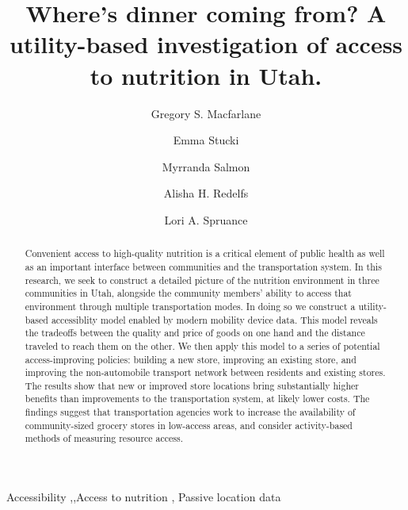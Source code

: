 \documentclass[
  letterpaper,
  number,
  review,
  3p]{elsarticle}
\providecommand{\DIFadd}[1]{{\protect\color{blue}\uwave{#1}}} %
\providecommand{\DIFaddbegin}{} %
\providecommand{\DIFaddend}{} %
\newcommand{\DIFaddincludegraphics}[2][]{{\color{blue}\fbox{\DIFOincludegraphics[#1]{#2}}}} %
\DeclareRobustCommand{\DIFaddbegin}{\DIFOaddbegin \let\includegraphics\DIFaddincludegraphics} %
\DeclareRobustCommand{\DIFaddend}{\DIFOaddend \let\includegraphics\DIFOincludegraphics} %
\begin{document}
\begin{frontmatter}
\title{Where's dinner coming from? A utility-based investigation of
access to nutrition in Utah.}
\author[1]{Gregory S. Macfarlane%
%
}
\author[1]{Emma Stucki%
%
}

\author[1]{Myrranda Salmon%
%
}

\author[2]{Alisha H. Redelfs%
%
}

\author[2]{Lori A. Spruance%
%
}








        
\begin{abstract}
Convenient access to high-quality nutrition is a critical element of
public health as well as an important interface between communities and
the transportation system. In this research, we seek to construct a
detailed picture of the nutrition environment in three communities in
Utah, alongside the community members' ability to access that
environment through multiple transportation modes. In doing so we
construct a utility-based accessiblity model enabled by modern mobility
device data. This model reveals the tradeoffs between the quality and
price of goods on one hand and the distance traveled to reach them on
the other. We then apply this model to a series of potential
access-improving policies: building a new store, improving an existing
store, and improving the non-automobile transport network between
residents and existing stores. The results show that new or improved
store locations bring substantially higher benefits than improvements to
the transportation system, at likely lower costs. The findings suggest
that transportation agencies work to increase the availability of
community-sized grocery stores in low-access areas, and consider
activity-based methods of measuring resource access.
\end{abstract}





\begin{keyword}
    Accessibility \sep \DIFaddbegin \DIFadd{Utility-based access }\sep \DIFaddend Access to
nutrition \sep 
    Passive location data
\end{keyword}
\end{frontmatter}
\end{document}
